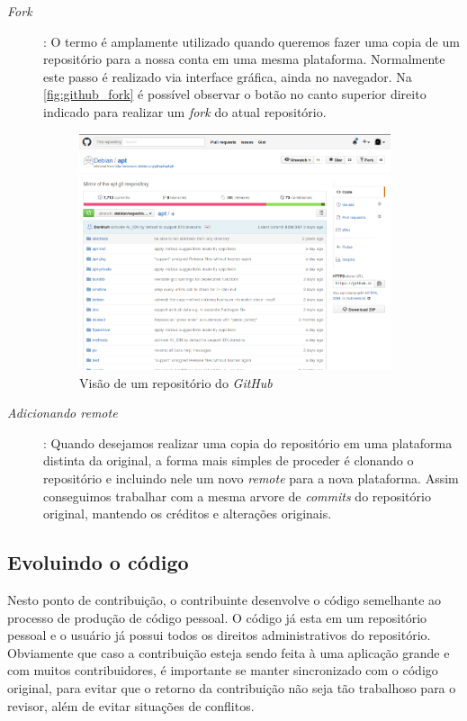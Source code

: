 \begin{description}
	\item [\textit{Fork}]: O termo é amplamente utilizado quando queremos fazer uma copia de um repositório para a nossa conta em uma mesma plataforma. Normalmente este passo é realizado via interface gráfica, ainda no navegador. Na \autoref{fig:github_fork} é possível observar o botão no canto superior direito indicado para realizar um \textit{fork} do atual repositório.

	\begin{figure}[h]
	  \centering
		\includegraphics[width=0.90\textwidth]{figuras/fork}
	  \caption{Visão de um repositório do \textit{GitHub}}
	  \label{fig:github_fork}
	\end{figure}

	\item [\textit{Adicionando \textit{remote}}]: Quando desejamos realizar uma copia do repositório em uma plataforma distinta da original, a forma mais simples de proceder é clonando o repositório e incluindo nele um novo \textit{remote} para a nova plataforma. Assim conseguimos trabalhar com a mesma arvore de \textit{commits} do repositório original, mantendo os créditos e alterações originais.
\end{description}

\subsection*{Evoluindo o código} %
\label{sub:evoluindo_o_c_digo}

Nesto ponto de contribuição, o contribuinte desenvolve o código semelhante ao processo de produção de código pessoal. O código já esta em um repositório pessoal e o usuário já possui todos os direitos administrativos do repositório. Obviamente que caso a contribuição esteja sendo feita à uma aplicação grande e com muitos contribuidores, é importante se manter sincronizado com o código original, para evitar que o retorno da contribuição não seja tão trabalhoso para o revisor, além de evitar situações de conflitos.

